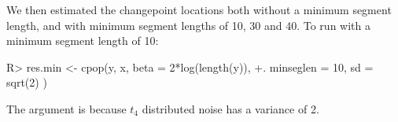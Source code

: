 \documentclass[nojss]{jss}
\begin{document}
We then estimated the changepoint locations both without a minimum segment length, and with minimum segment lengths of 10, 30 and 40. To run  with a minimum segment length of 10:
\begin{CodeChunk}
\begin{CodeInput}
R> res.min <- cpop(y, x, beta = 2*log(length(y)),
  +. minseglen = 10, sd = sqrt(2) )
\end{CodeInput}
\end{CodeChunk}
The argument  is because $t_4$ distributed noise has a variance of 2.
%
%
%
\end{document}
